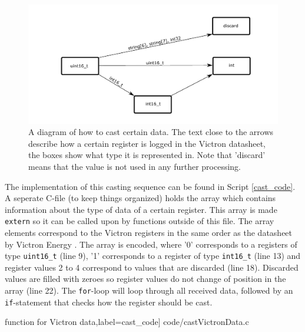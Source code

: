 \begin{figure}[!ht]
  \centering
    \includegraphics[width=\textwidth]{images/Cast_diagram.pdf}
      \caption{A diagram of how to cast certain data. The text close to the arrows describe how a certain register is logged in the Victron datasheet, the boxes show what type it is represented in. Note that 'discard' means that the value is not used in any further processing.}\label{fig:casting}
\end{figure}

The implementation of this casting sequence can be found in Script \ref{cast_code}. A seperate C-file (to keep things organized) holds the array which contains information about the type of data of a certain register. This array is made \verb|extern| so it can be called upon by functions outside of this file. The array elements correspond to the Victron registers in the same order as the datasheet by Victron Energy \cite{excel_registers}. The array is encoded, where '0' corresponds to a registers of type \verb|uint16_t| (line 9), '1' corresponds to a register of type \verb|int16_t| (line 13) and register values 2 to 4 correspond to values that are discarded (line 18). Discarded values are filled with zeroes so register values do not change of position in the array (line 22). The \verb|for|-loop will loop through all received data, followed by an \verb|if|-statement that checks how the register should be cast.

\scriptsize
	 function for Victron data,label=cast_code] {code/castVictronData.c}
\normalsize


%
%
%

